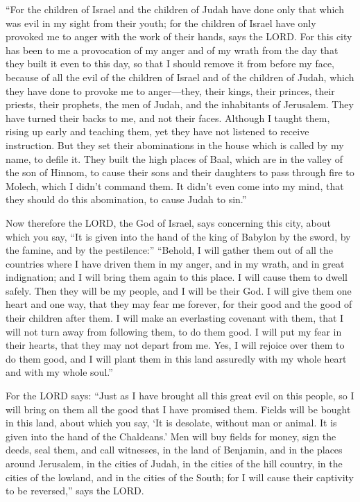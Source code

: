  ``For the children of Israel and the children of Judah
have done only that which was evil in my sight from their youth; for the
children of Israel have only provoked me to anger with the work of their
hands, says the LORD.  For this city has been to me a
provocation of my anger and of my wrath from the day that they built it
even to this day, so that I should remove it from before my face,
 because of all the evil of the children of Israel and of
the children of Judah, which they have done to provoke me to
anger---they, their kings, their princes, their priests, their prophets,
the men of Judah, and the inhabitants of Jerusalem.  They
have turned their backs to me, and not their faces. Although I taught
them, rising up early and teaching them, yet they have not listened to
receive instruction.  But they set their abominations in
the house which is called by my name, to defile it.  They
built the high places of Baal, which are in the valley of the son of
Hinnom, to cause their sons and their daughters to pass through fire to
Molech, which I didn't command them. It didn't even come into my mind,
that they should do this abomination, to cause Judah to sin.''

 Now therefore the LORD, the God of Israel, says
concerning this city, about which you say, ``It is given into the hand
of the king of Babylon by the sword, by the famine, and by the
pestilence:''  ``Behold, I will gather them out of all
the countries where I have driven them in my anger, and in my wrath, and
in great indignation; and I will bring them again to this place. I will
cause them to dwell safely.  Then they will be my people,
and I will be their God.  I will give them one heart and
one way, that they may fear me forever, for their good and the good of
their children after them.  I will make an everlasting
covenant with them, that I will not turn away from following them, to do
them good. I will put my fear in their hearts, that they may not depart
from me.  Yes, I will rejoice over them to do them good,
and I will plant them in this land assuredly with my whole heart and
with my whole soul.''

 For the LORD says: ``Just as I have brought all this
great evil on this people, so I will bring on them all the good that I
have promised them.  Fields will be bought in this land,
about which you say, `It is desolate, without man or animal. It is given
into the hand of the Chaldeans.'  Men will buy fields for
money, sign the deeds, seal them, and call witnesses, in the land of
Benjamin, and in the places around Jerusalem, in the cities of Judah, in
the cities of the hill country, in the cities of the lowland, and in the
cities of the South; for I will cause their captivity to be reversed,''
says the LORD.

